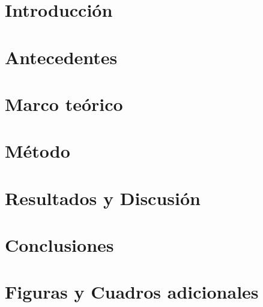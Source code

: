 \documentclass[12pt,letterpaper,spanish, twoside]{book}
\title{}
\author{Omar Pi\~na Ram\'irez}
\begin{document}
 

\chapter{Introducción}
  

\chapter{Antecedentes}

\chapter{Marco teórico}

\chapter{Método}

\chapter{Resultados y Discusión}
 
\chapter{Conclusiones}

\appendix
\chapter{Figuras y Cuadros adicionales}

\newpage

\printbibliography

%
\end{document}
